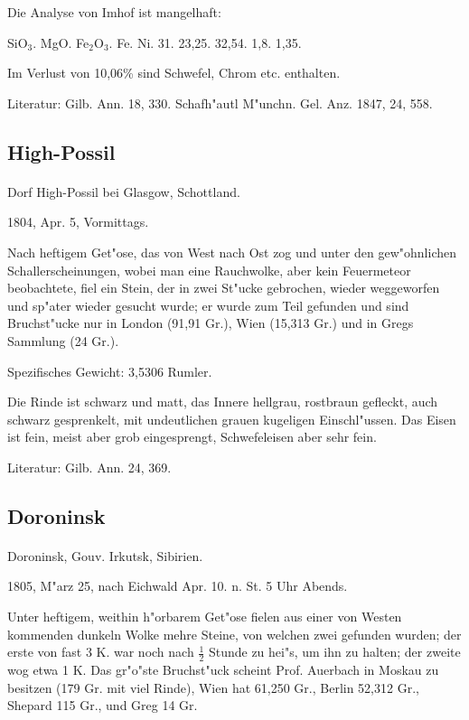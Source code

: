 \documentclass[a4paper, 11pt, oneside]{article}
\begin{document}
Die Analyse von Imhof ist mangelhaft:

SiO$_{3}$. MgO. Fe$_{2}$O$_{3}$. Fe. Ni.  
31. 23,25. 32,54. 1,8. 1,35.

Im Verlust von 10,06\% sind Schwefel, Chrom etc. enthalten.

Literatur: Gilb. Ann. 18, 330. Schafh"autl M"unchn. Gel. Anz. 1847, 24, 558.

\subsection{High-Possil}
\normalsize
\paragraph{}
Dorf High-Possil bei Glasgow, Schottland.

1804, Apr. 5, Vormittags.

Nach heftigem Get"ose, das von West nach Ost zog und unter den gew"ohnlichen Schallerscheinungen, wobei man eine Rauchwolke, aber kein Feuermeteor beobachtete, fiel ein Stein, der in zwei St"ucke gebrochen, wieder weggeworfen und sp"ater wieder gesucht wurde; er wurde zum Teil gefunden und sind Bruchst"ucke nur in London (91,91 Gr.), Wien (15,313 Gr.) und in Gregs Sammlung (24 Gr.).

Spezifisches Gewicht: 3,5306 Rumler.

Die Rinde ist schwarz und matt, das Innere hellgrau, rostbraun gefleckt, auch schwarz gesprenkelt, mit undeutlichen grauen kugeligen Einschl"ussen. Das Eisen ist fein, meist aber grob eingesprengt, Schwefeleisen aber sehr fein.

Literatur: Gilb. Ann. 24, 369.

\subsection{Doroninsk}
\normalsize
\paragraph{}
Doroninsk, Gouv. Irkutsk, Sibirien.

1805, M"arz 25, nach Eichwald Apr. 10. n. St. 5 Uhr Abends.

Unter heftigem, weithin h"orbarem Get"ose fielen aus einer von Westen kommenden dunkeln Wolke mehre Steine, von welchen zwei gefunden wurden; der erste von fast 3 K. war noch nach $\frac{1}{2}$ Stunde zu hei"s, um ihn zu halten; der zweite wog etwa 1 K. Das gr"o"ste Bruchst"uck scheint Prof. Auerbach in Moskau zu besitzen (179 Gr. mit viel Rinde), Wien hat 61,250 Gr., Berlin 52,312 Gr., Shepard 115 Gr., und Greg 14 Gr.
\end{document}
